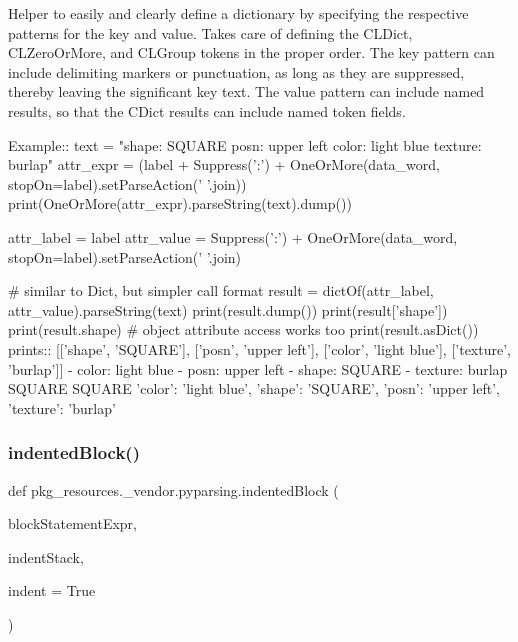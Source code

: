 \begin{DoxyVerb}Helper to easily and clearly define a dictionary by specifying the respective patterns
for the key and value.  Takes care of defining the C{L{Dict}}, C{L{ZeroOrMore}}, and C{L{Group}} tokens
in the proper order.  The key pattern can include delimiting markers or punctuation,
as long as they are suppressed, thereby leaving the significant key text.  The value
pattern can include named results, so that the C{Dict} results can include named token
fields.

Example::
    text = "shape: SQUARE posn: upper left color: light blue texture: burlap"
    attr_expr = (label + Suppress(':') + OneOrMore(data_word, stopOn=label).setParseAction(' '.join))
    print(OneOrMore(attr_expr).parseString(text).dump())
    
    attr_label = label
    attr_value = Suppress(':') + OneOrMore(data_word, stopOn=label).setParseAction(' '.join)

    # similar to Dict, but simpler call format
    result = dictOf(attr_label, attr_value).parseString(text)
    print(result.dump())
    print(result['shape'])
    print(result.shape)  # object attribute access works too
    print(result.asDict())
prints::
    [['shape', 'SQUARE'], ['posn', 'upper left'], ['color', 'light blue'], ['texture', 'burlap']]
    - color: light blue
    - posn: upper left
    - shape: SQUARE
    - texture: burlap
    SQUARE
    SQUARE
    {'color': 'light blue', 'shape': 'SQUARE', 'posn': 'upper left', 'texture': 'burlap'}
\end{DoxyVerb}
 \mbox{\label{namespacepkg__resources_1_1__vendor_1_1pyparsing_a00b0231ca8c234e70b6cd0b450d4fea3}} 
\subsubsection{\texorpdfstring{indented\+Block()}{indentedBlock()}}
{\footnotesize\ttfamily def pkg\+\_\+resources.\+\_\+vendor.\+pyparsing.\+indented\+Block (\begin{DoxyParamCaption}\item[{}]{block\+Statement\+Expr,  }\item[{}]{indent\+Stack,  }\item[{}]{indent = {\ttfamily True} }\end{DoxyParamCaption})}

